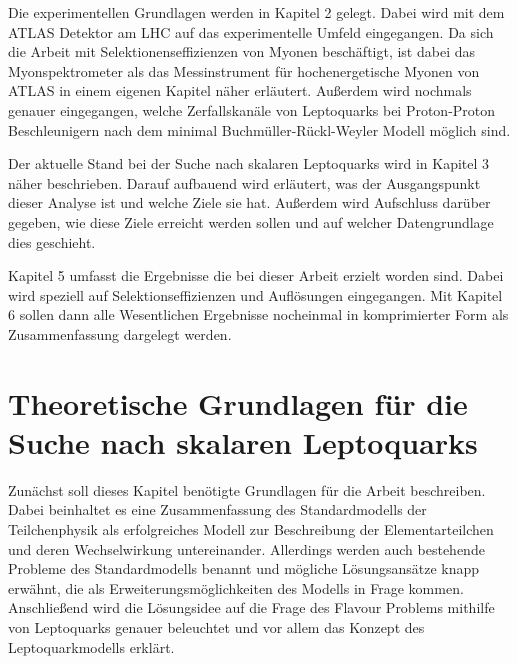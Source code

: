 Die experimentellen Grundlagen werden in Kapitel 2 gelegt. Dabei wird mit dem ATLAS Detektor am LHC auf das experimentelle Umfeld eingegangen. Da sich die Arbeit mit Selektionenseffizienzen von Myonen beschäftigt, ist dabei das Myonspektrometer als das Messinstrument für hochenergetische Myonen von ATLAS in einem eigenen Kapitel näher erläutert. Außerdem wird nochmals genauer eingegangen, welche Zerfallskanäle von Leptoquarks bei Proton-Proton Beschleunigern nach dem minimal Buchmüller-Rückl-Weyler Modell möglich sind.

Der aktuelle Stand bei der Suche nach skalaren Leptoquarks wird in Kapitel 3 näher beschrieben. Darauf aufbauend wird erläutert, was der Ausgangspunkt dieser Analyse ist und welche Ziele sie hat. Außerdem wird Aufschluss darüber gegeben, wie diese Ziele erreicht werden sollen und auf welcher Datengrundlage dies geschieht. 

Kapitel 5 umfasst die Ergebnisse die bei dieser Arbeit erzielt worden sind. Dabei wird speziell auf Selektionseffizienzen und Auflösungen eingegangen. Mit Kapitel 6 sollen dann alle Wesentlichen Ergebnisse nocheinmal in komprimierter Form als Zusammenfassung dargelegt werden.  
\chapter{Theoretische Grundlagen für die Suche nach skalaren Leptoquarks}%
Zunächst soll dieses Kapitel benötigte Grundlagen für die Arbeit beschreiben. Dabei beinhaltet es eine Zusammenfassung des Standardmodells der Teilchenphysik als erfolgreiches Modell zur Beschreibung der Elementarteilchen und deren Wechselwirkung untereinander. Allerdings werden auch bestehende Probleme des Standardmodells benannt und mögliche Lösungsansätze knapp erwähnt, die als Erweiterungs\-mög\-lich\-keiten des Modells in Frage kommen. Anschließend wird die Lösungsidee auf die Frage des Flavour Problems mithilfe von Leptoquarks genauer beleuchtet und vor allem das Konzept des Leptoquarkmodells erklärt.   
